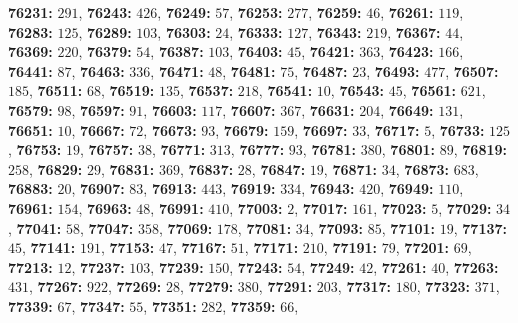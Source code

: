 \textsf{\bfseries 76231:} $291$, \textsf{\bfseries 76243:} $426$, \textsf{\bfseries 76249:} $57$, \textsf{\bfseries 76253:} $277$, \textsf{\bfseries 76259:} $46$, \textsf{\bfseries 76261:} $119$, \textsf{\bfseries 76283:} $125$, \textsf{\bfseries 76289:} $103$, \textsf{\bfseries 76303:} $24$, \textsf{\bfseries 76333:} $127$, \textsf{\bfseries 76343:} $219$, \textsf{\bfseries 76367:} $44$, \textsf{\bfseries 76369:} $220$, \textsf{\bfseries 76379:} $54$, \textsf{\bfseries 76387:} $103$, \textsf{\bfseries 76403:} $45$, \textsf{\bfseries 76421:} $363$, \textsf{\bfseries 76423:} $166$, \textsf{\bfseries 76441:} $87$, \textsf{\bfseries 76463:} $336$, \textsf{\bfseries 76471:} $48$, \textsf{\bfseries 76481:} $75$, \textsf{\bfseries 76487:} $23$, \textsf{\bfseries 76493:} $477$, \textsf{\bfseries 76507:} $185$, \textsf{\bfseries 76511:} $68$, \textsf{\bfseries 76519:} $135$, \textsf{\bfseries 76537:} $218$, \textsf{\bfseries 76541:} $10$, \textsf{\bfseries 76543:} $45$, \textsf{\bfseries 76561:} $621$, \textsf{\bfseries 76579:} $98$, \textsf{\bfseries 76597:} $91$, \textsf{\bfseries 76603:} $117$, \textsf{\bfseries 76607:} $367$, \textsf{\bfseries 76631:} $204$, \textsf{\bfseries 76649:} $131$, \textsf{\bfseries 76651:} $10$, \textsf{\bfseries 76667:} $72$, \textsf{\bfseries 76673:} $93$, \textsf{\bfseries 76679:} $159$, \textsf{\bfseries 76697:} $33$, \textsf{\bfseries 76717:} $5$, \textsf{\bfseries 76733:} $125$, \textsf{\bfseries 76753:} $19$, \textsf{\bfseries 76757:} $38$, \textsf{\bfseries 76771:} $313$, \textsf{\bfseries 76777:} $93$, \textsf{\bfseries 76781:} $380$, \textsf{\bfseries 76801:} $89$, \textsf{\bfseries 76819:} $258$, \textsf{\bfseries 76829:} $29$, \textsf{\bfseries 76831:} $369$, \textsf{\bfseries 76837:} $28$, \textsf{\bfseries 76847:} $19$, \textsf{\bfseries 76871:} $34$, \textsf{\bfseries 76873:} $683$, \textsf{\bfseries 76883:} $20$, \textsf{\bfseries 76907:} $83$, \textsf{\bfseries 76913:} $443$, \textsf{\bfseries 76919:} $334$, \textsf{\bfseries 76943:} $420$, \textsf{\bfseries 76949:} $110$, \textsf{\bfseries 76961:} $154$, \textsf{\bfseries 76963:} $48$, \textsf{\bfseries 76991:} $410$, \textsf{\bfseries 77003:} $2$, \textsf{\bfseries 77017:} $161$, \textsf{\bfseries 77023:} $5$, \textsf{\bfseries 77029:} $34$, \textsf{\bfseries 77041:} $58$, \textsf{\bfseries 77047:} $358$, \textsf{\bfseries 77069:} $178$, \textsf{\bfseries 77081:} $34$, \textsf{\bfseries 77093:} $85$, \textsf{\bfseries 77101:} $19$, \textsf{\bfseries 77137:} $45$, \textsf{\bfseries 77141:} $191$, \textsf{\bfseries 77153:} $47$, \textsf{\bfseries 77167:} $51$, \textsf{\bfseries 77171:} $210$, \textsf{\bfseries 77191:} $79$, \textsf{\bfseries 77201:} $69$, \textsf{\bfseries 77213:} $12$, \textsf{\bfseries 77237:} $103$, \textsf{\bfseries 77239:} $150$, \textsf{\bfseries 77243:} $54$, \textsf{\bfseries 77249:} $42$, \textsf{\bfseries 77261:} $40$, \textsf{\bfseries 77263:} $431$, \textsf{\bfseries 77267:} $922$, \textsf{\bfseries 77269:} $28$, \textsf{\bfseries 77279:} $380$, \textsf{\bfseries 77291:} $203$, \textsf{\bfseries 77317:} $180$, \textsf{\bfseries 77323:} $371$, \textsf{\bfseries 77339:} $67$, \textsf{\bfseries 77347:} $55$, \textsf{\bfseries 77351:} $282$, \textsf{\bfseries 77359:} $66$, 
